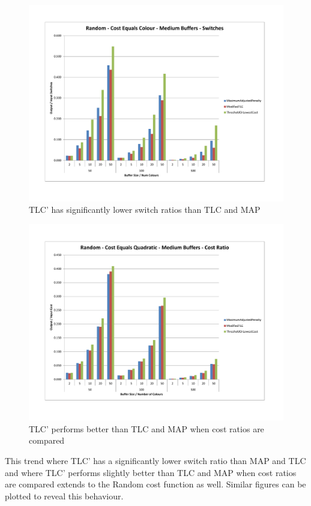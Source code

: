 \begin{figure}[ht]
\centering 
\includegraphics[scale=0.60]{Random-cc-medium-switches.pdf}
\caption{TLC' has significantly lower switch ratios than TLC and MAP}
\label{randomCCMedium Switches}
\end{figure}   

\begin{figure}[ht]
\centering 
\includegraphics[scale=0.60]{Random-cq-medium-cost.pdf}
\caption{TLC' performs better than TLC and MAP when cost ratios are compared}
\label{randomCQMediumCost}
\end{figure}   

This trend where TLC' has a significantly lower switch ratio than MAP and TLC and where TLC' performs slightly better than TLC and MAP when cost ratios are compared extends to the Random cost function as well. Similar figures can be plotted to reveal this behaviour. 

